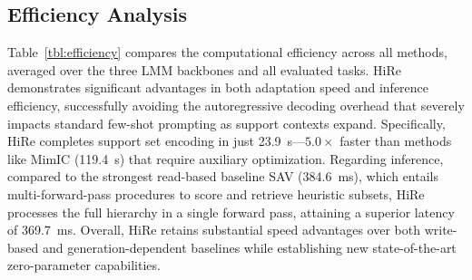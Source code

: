 \documentclass[sigconf,review,anonymous,9pt,table]{acmart}
\begin{document}
\begin{table}[t]
\centering
{}
\caption{\textbf{Ablation study (Qwen2-VL-7B).} Full multi-level Mahalanobis formulation achieves highest accuracy across task groups. Row (E) is the baseline.}
\label{tbl:ablation}
\end{table}

\subsection{Efficiency Analysis}
\label{sec:efficiency}

Table~\ref{tbl:efficiency} compares the computational efficiency across all methods, averaged over the three LMM backbones and all evaluated tasks. 
HiRe demonstrates significant advantages in both adaptation speed and inference efficiency, successfully avoiding the autoregressive decoding overhead that severely impacts standard few-shot prompting as support contexts expand. 
Specifically, HiRe completes support set encoding in just 23.9~s—$5.0\times$ faster than methods like MimIC (119.4~s) that require auxiliary optimization. 
Regarding inference, compared to the strongest read-based baseline SAV (384.6~ms), which entails multi-forward-pass procedures to score and retrieve heuristic subsets, HiRe processes the full hierarchy in a single forward pass, attaining a superior latency of 369.7~ms.
Overall, HiRe retains substantial speed advantages over both write-based and generation-dependent baselines while establishing new state-of-the-art zero-parameter capabilities.
\end{document}
